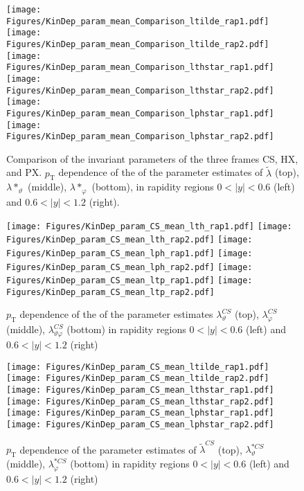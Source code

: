 \documentclass[12pt]{article}
\newcommand{\pT}{p_\mathrm{T}}
\newcommand{\absy}{\left |  y \right |}
\newcommand{\lamtilde}{\tilde{\lambda}}
\newcommand{\lamthstar}{\lambda*_\vartheta}
\newcommand{\lamphstar}{\lambda*_\varphi}
\newcommand{\lamthCS}{\lambda^{\scriptscriptstyle CS}_\vartheta}
\newcommand{\lamphCS}{\lambda^{\scriptscriptstyle CS}_\varphi}
\newcommand{\lamthphCS}{\lambda^{\scriptscriptstyle CS}_{\vartheta \varphi}}
\newcommand{\lamtildeCS}{\tilde{\lambda}^{\scriptscriptstyle CS}}
\newcommand{\lamthstarCS}{\lambda^{* \scriptscriptstyle CS}_\vartheta}
\newcommand{\lamphstarCS}{\lambda^{* \scriptscriptstyle CS}_\varphi}
\begin{document}




\begin{figure}[htbp]
\centering
\texttt{[image: Figures/KinDep\_param\_mean\_Comparison\_ltilde\_rap1.pdf]}
\texttt{[image: Figures/KinDep\_param\_mean\_Comparison\_ltilde\_rap2.pdf]}
\texttt{[image: Figures/KinDep\_param\_mean\_Comparison\_lthstar\_rap1.pdf]}
\texttt{[image: Figures/KinDep\_param\_mean\_Comparison\_lthstar\_rap2.pdf]}
\texttt{[image: Figures/KinDep\_param\_mean\_Comparison\_lphstar\_rap1.pdf]}
\texttt{[image: Figures/KinDep\_param\_mean\_Comparison\_lphstar\_rap2.pdf]}
\caption{Comparison of the invariant parameters of the three frames CS, HX,
and PX. $\pT$ dependence of the of the
parameter estimates of $\lamtilde$ (top), $\lamthstar$ (middle), $\lamphstar$ (bottom), in rapidity regions $0<\absy<0.6$ (left) and
$0.6<\absy<1.2$ (right).}
\end{figure}
\clearpage





\begin{figure}[htbp]
\centering
\texttt{[image: Figures/KinDep\_param\_CS\_mean\_lth\_rap1.pdf]}
\texttt{[image: Figures/KinDep\_param\_CS\_mean\_lth\_rap2.pdf]}
\texttt{[image: Figures/KinDep\_param\_CS\_mean\_lph\_rap1.pdf]}
\texttt{[image: Figures/KinDep\_param\_CS\_mean\_lph\_rap2.pdf]}
\texttt{[image: Figures/KinDep\_param\_CS\_mean\_ltp\_rap1.pdf]}
\texttt{[image: Figures/KinDep\_param\_CS\_mean\_ltp\_rap2.pdf]}
\caption{$\pT$ dependence of the of the parameter estimates $\lamthCS$ (top), $\lamphCS$ (middle), $\lamthphCS$ (bottom) in rapidity regions $0<\absy<0.6$ (left) and $0.6<\absy<1.2$ (right)}
\end{figure}
\clearpage

\begin{figure}[htbp]
\centering
\texttt{[image: Figures/KinDep\_param\_CS\_mean\_ltilde\_rap1.pdf]}
\texttt{[image: Figures/KinDep\_param\_CS\_mean\_ltilde\_rap2.pdf]}
\texttt{[image: Figures/KinDep\_param\_CS\_mean\_lthstar\_rap1.pdf]}
\texttt{[image: Figures/KinDep\_param\_CS\_mean\_lthstar\_rap2.pdf]}
\texttt{[image: Figures/KinDep\_param\_CS\_mean\_lphstar\_rap1.pdf]}
\texttt{[image: Figures/KinDep\_param\_CS\_mean\_lphstar\_rap2.pdf]}
\caption{$\pT$ dependence of the parameter estimates of $\lamtildeCS$ (top),
$\lamthstarCS$ (middle), $\lamphstarCS$ (bottom) in rapidity regions $0<\absy<0.6$ (left) and $0.6<\absy<1.2$ (right)}
\end{figure}
\clearpage
\end{document}

